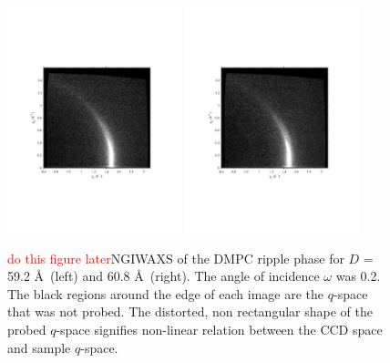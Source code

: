 \begin{figure}[htbp]
  \centering
  \includegraphics[trim=50 170 50 200,clip,width=0.45\textwidth]{figures/ripple/NGIWAXS/dmpc1_046}
  \includegraphics[trim=50 170 50 200,clip,width=0.45\textwidth]{figures/ripple/NGIWAXS/dmpc1_052-060}
  \caption{\textcolor{red}{do this figure later}NGIWAXS of the DMPC ripple phase for $D$ = 59.2 \AA\ (left)
  and 60.8 \AA\ (right). The angle of incidence $\omega$ was 0.2\textdegree.
  The black regions around the edge of each image are the $q$-space that 
  was not probed. The distorted, non rectangular shape of the probed $q$-space
  signifies non-linear relation between the CCD space and sample $q$-space.}
  \label{fig:NGIWAXS}
\end{figure}

